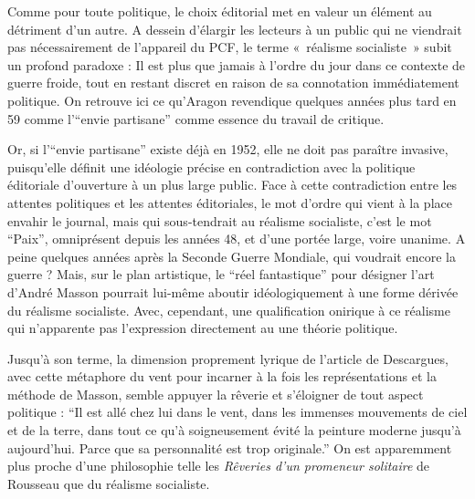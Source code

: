 	Comme pour toute politique, le choix éditorial met en valeur un élément au détriment d’un autre. A dessein d’élargir les lecteurs à un public qui ne viendrait pas nécessairement de l’appareil du PCF, le terme « réalisme socialiste » subit un profond paradoxe : Il est plus que jamais à l’ordre du jour dans ce contexte de guerre froide, tout en restant discret en raison de sa connotation immédiatement politique. On retrouve ici ce qu’Aragon revendique quelques années plus tard en 59 comme l’\enquote{envie partisane} comme essence du travail de critique. 

Or, si l’\enquote{envie partisane} existe déjà en 1952, elle ne doit pas paraître invasive, puisqu’elle définit une idéologie précise en contradiction avec la politique éditoriale d’ouverture à un plus large public. Face à cette contradiction entre les attentes politiques et les attentes éditoriales, le mot d’ordre qui vient à la place envahir le journal, mais qui sous-tendrait au réalisme socialiste, c’est le mot \enquote{Paix}, omniprésent depuis les années 48, et d’une portée large, voire unanime. A peine quelques années après la Seconde Guerre Mondiale, qui voudrait encore la guerre ? Mais, sur le plan artistique, le \enquote{réel fantastique} pour désigner l’art d’André Masson pourrait lui-même aboutir idéologiquement à une forme dérivée du réalisme socialiste. Avec, cependant, une qualification onirique à ce réalisme qui n’apparente pas l’expression directement au une théorie politique. 

Jusqu’à son terme, la dimension proprement lyrique de l’article de Descargues, avec cette métaphore du vent pour incarner à la fois les représentations et la méthode de Masson, semble appuyer la rêverie et s’éloigner de tout aspect politique : \enquote{Il est allé chez lui dans le vent, dans les immenses mouvements de ciel et de la terre, dans tout ce qu’à soigneusement évité la peinture moderne jusqu’à aujourd’hui. Parce que sa personnalité est trop originale.} On est apparemment plus proche d’une philosophie telle les \emph{Rêveries d’un promeneur solitaire} de Rousseau que du réalisme socialiste. 

